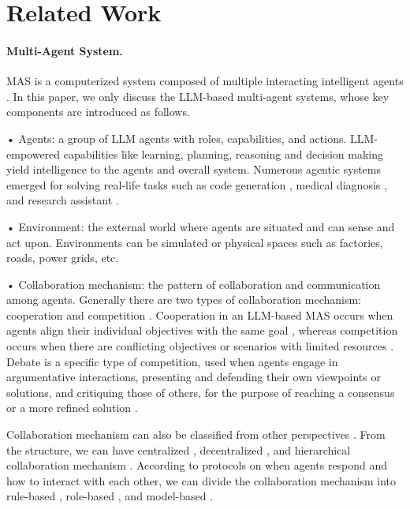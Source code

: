 \documentclass[11pt]{article}
\begin{document}
\section{Related Work}

\paragraph{Multi-Agent System.}
MAS is a computerized system composed of multiple interacting intelligent agents \citep{tran2025multi}. In this paper, we only discuss the LLM-based multi-agent systems, whose key components are introduced as follows.

• Agents: a group of LLM agents with roles, capabilities, and actions. LLM-empowered capabilities like learning, planning, reasoning and decision making  yield intelligence to the agents and overall system. Numerous agentic systems emerged for solving real-life tasks such as code generation \citep{tang-etal-2024-codeagent,yang2024swe}, medical diagnosis \citep{tu2025towards,schmidgall2025agentclinic,mcduff2025towards}, and research assistant \citep{baek-etal-2025-researchagent,schmidgall2025agentlaboratoryusingllm}.

• Environment: the external world where agents are situated and can sense and act upon. Environments can be simulated or physical spaces such as factories, roads, power grids, etc. 

• Collaboration mechanism: the pattern of collaboration and communication among agents. Generally there are two types of collaboration mechanism: cooperation \citep{islam-etal-2024mapcoder,li2023camel,shinn2023reflexion,he-etal-2023lego,10429926} and competition \citep{he-etal-2023lego,chen_llmarena_2024}.
Cooperation in an LLM-based MAS occurs when agents align their individual objectives with the same goal \citep{tran2025multi}, whereas 
competition occurs when there are conflicting objectives or scenarios with limited resources \citep{tran2025multi}. 
Debate is a specific type of competition, used when agents engage in argumentative interactions, presenting and defending their own viewpoints or solutions, and critiquing those of others, for the purpose of reaching a consensus or a more refined solution \citep{yin2023exchangeofthought,liang-etal-2024-encouraging, chan2308chateval}. 

Collaboration mechanism can also be classified from other perspectives \citep{tran2025multi}. From the structure, we can have centralized \citep{jiang-etal-2023-llmblender,qiao-etal-2024autoact}, decentralized \citep{yin2023exchangeofthought,zhang2023cumulative,chen2024agentverse,zhang-etal-2024-exploringpsychologyview}, and hierarchical collaboration mechanism \citep{chan2308chateval,li2023camel,du2023improving}. According to protocols on when agents respond and how to interact with each other, we can divide the collaboration mechanism into rule-based \citep{zhang-etal-2024-exploringpsychologyview,chen_multi-agent_2025}, role-based \citep{chen2024agentverse,hong2024metagpt,talebirad2023multi}, and model-based \citep{li-etal-2023-theoryofmind,xu-etal-2024-magic}.
\end{document}
